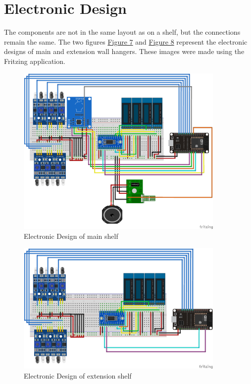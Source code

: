 \documentclass{article}
\begin{document}
\section{Electronic Design}
The components are not in the same layout as on a shelf, but the connections remain the same. The two figures \hyperref[fig:electronics-main]{Figure 7} and \hyperref[fig:electronics-extension]{Figure 8} represent the electronic designs of main and extension wall hangers. These images were made using the Fritzing application.
\begin{figure}[H]
    \begin{center}
        \includegraphics[width=0.9\textwidth]{main_shelf.png}
    \end{center}
    \caption{Electronic Design of main shelf}
    \label{fig:electronics-main}
\end{figure}
\begin{figure}[H]
    \begin{center}
        \includegraphics[width=0.9\textwidth]{extension_shelf.png}
    \end{center}
    \caption{Electronic Design of extension shelf}
    \label{fig:electronics-extension}
\end{figure}
\end{document}
